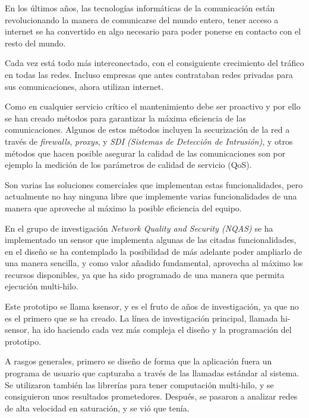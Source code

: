 
En los últimos años, las tecnologías informáticas de la comunicación están revolucionando la manera de comunicarse del mundo entero, tener acceso a internet se ha convertido en algo necesario para poder ponerse en contacto con el resto del mundo.

Cada vez está todo más interconectado, con el consiguiente crecimiento del tráfico en todas las redes. Incluso empresas que antes contrataban redes privadas para sus comunicaciones, ahora utilizan internet.

Como en cualquier servicio crítico el mantenimiento debe ser proactivo y por ello se han creado métodos para garantizar la máxima eficiencia de las comunicaciones. Algunos de estos métodos incluyen la securización de la red a través de \textit{firewalls}, \textit{proxys}, y \textit{SDI (Sistemas de Detección de Intrusión)}, y otros métodos que hacen posible asegurar la calidad de las comunicaciones son por ejemplo la medición de los parámetros de calidad de servicio (QoS).

Son varias las soluciones comerciales que implementan estas funcionalidades, pero actualmente no hay ninguna libre que implemente varias funcionalidades de una manera que aproveche al máximo la posible eficiencia del equipo.

En el grupo de investigación \textit{Network Quality and Security (NQAS)} se ha implementado un sensor que implementa algunas de las citadas funcionalidades, en el diseño se ha contemplado la posibilidad de más adelante poder ampliarlo de una manera sencilla, y como valor añadido fundamental, aprovecha al máximo los recursos disponibles, ya que ha sido programado de una manera que permita ejecución multi-hilo.

Este prototipo se llama ksensor, y es el fruto de años de investigación, ya que no es el primero que se ha creado. La línea de investigación principal, llamada hi-sensor, ha ido haciendo cada vez más compleja el diseño y la programación del prototipo. 

A rasgos generales, primero se diseño de forma que la aplicación fuera un programa de usuario que capturaba a través de las llamadas estándar al sistema. Se utilizaron también las librerías para tener computación multi-hilo, y se consiguieron unos resultados prometedores. Después, se pasaron a analizar redes de alta velocidad en saturación, y se vió que tenía.